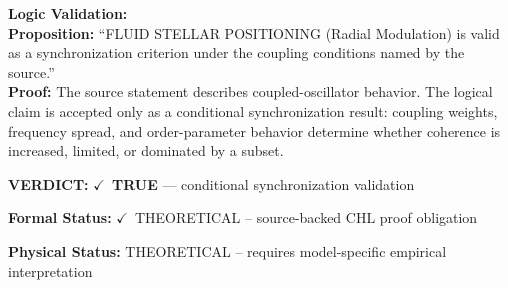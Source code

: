 \textbf{Logic Validation:}\\
\textbf{Proposition:} ``FLUID STELLAR POSITIONING (Radial Modulation) is valid as a synchronization criterion
under the coupling conditions named by the source.''\\
\textbf{Proof:} The source statement describes coupled-oscillator behavior. The logical claim is
accepted only as a conditional synchronization result: coupling weights, frequency
spread, and order-parameter behavior determine whether coherence is increased, limited,
or dominated by a subset.

\textbf{VERDICT:} \ensuremath{\checkmark}\ \textbf{TRUE} --- conditional synchronization validation

\textbf{Formal Status:} \ensuremath{\checkmark}\ THEORETICAL -- source-backed CHL proof obligation

\textbf{Physical Status:} THEORETICAL -- requires model-specific empirical interpretation
\par\vspace{0.45em}
\par
\ifTZPDarkEdition
{}
\fi
\endgroup
\endgroup
